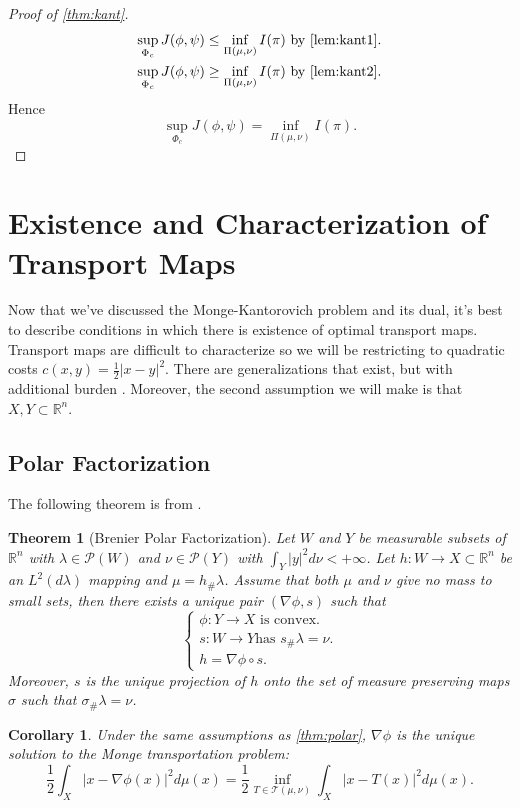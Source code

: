 \documentclass[12pt]{article}
\newcommand{\R}{\mathbb{R}}
\theoremstyle{plain}
\newtheorem{thm}{Theorem}[section]
\newtheorem{cor}{Corollary}[section]
\numberwithin{equation}{section}
\begin{document}
\begin{proof}[Proof of \autoref{thm:kant}]
  \begin{align*}
    \sup_{\Phi_c}J(\phi,\psi)\le \inf_{\Pi(\mu,\nu)}I(\pi) &\,\,\text{by \autoref{lem:kant1}}. \\
    \sup_{\Phi_c}J(\phi,\psi)\ge \inf_{\Pi(\mu,\nu)}I(\pi) &\,\,\text{by \autoref{lem:kant2}}.
  \end{align*}
  Hence
  \[ \sup_{\Phi_c}J(\phi,\psi)= \inf_{\Pi(\mu,\nu)}I(\pi).\]
\end{proof}
\section{Existence and Characterization of Transport Maps}
Now that we've discussed the Monge-Kantorovich problem and its dual, it's best to describe conditions in which there is existence of optimal transport maps. Transport maps are difficult to characterize 
so we will be restricting to quadratic costs $c(x,y)=\frac{1}{2}|x-y|^2$. There are generalizations that exist, but with additional burden \cite{thorpe}. Moreover, the second assumption we will make is that $X,Y\subset \R^n$. 
\subsection{Polar Factorization}
The following theorem is from \cite{villani}.
\begin{thm}[Brenier Polar Factorization]\label{thm:polar}
  Let $W$ and $Y$ be measurable subsets of $\R^n$ with $\lambda\in\mathcal{P}(W)$ and $\nu\in\mathcal{P}(Y)$ with $\int_Y|y|^2d\nu < +\infty$. Let
  $h : W \to X\subset \R^n$ be an $L^2(d\lambda)$ mapping and $\mu = h_\#\lambda$. Assume that both $\mu$ and $\nu$ give no mass to small sets, then there exists a unique pair $(\nabla \phi,s)$ such that 
  \[\begin{cases}
    \phi: Y\to X \text{ is convex.} \\
    s : W\to Y \text{has $s_\# \lambda = \nu$.} \\
    h = \nabla \phi\circ s.
  \end{cases}\]
  Moreover, $s$ is the unique projection of $h$ onto the set of measure preserving maps $\sigma$ such that $\sigma_\# \lambda = \nu$.
\end{thm}
\begin{cor}
  Under the same assumptions as \autoref{thm:polar}, $\nabla\phi$ is the unique solution to the Monge transportation problem:
  \[\frac{1}{2}\int_X|x-\nabla\phi(x)|^2d\mu(x) = \frac{1}{2}\inf_{T\in\mathcal{T}(\mu,\nu)}\int_X|x-T(x)|^2d\mu(x).\]
\end{cor}
\end{document}
